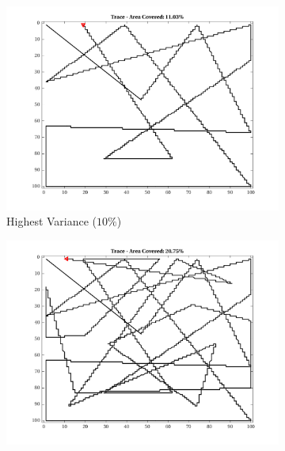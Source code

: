 \begin{figure}[htb!]
    \centering
        \begin{subfigure}[t]{0.32\textwidth}
        \centering
        \includegraphics[width=\linewidth]{figures/hbresults/path_nhv_10p_100x100_sf_100_seed_2.png}
        \ssp
        \captionsetup{skip=0.20\baselineskip,size=footnotesize}
        \caption{Highest Variance ($10\%$)}
    \end{subfigure}%
    \begin{subfigure}[t]{0.32\textwidth}
        \centering
        \includegraphics[width=\linewidth]{figures/hbresults/path_nhv_20p_100x100_sf_100_seed_2.png}
        \ssp
        \captionsetup{skip=0.20\baselineskip,size=footnotesize}

\end{subfigure}
\end{figure}
